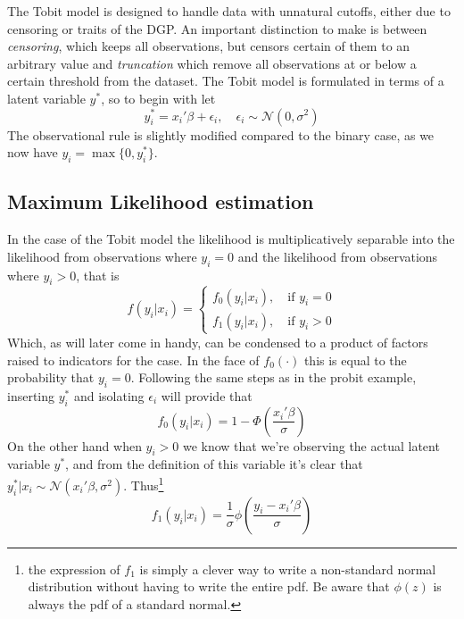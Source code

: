The Tobit model is designed to handle data with unnatural cutoffs, either due to censoring or traits of the DGP. An important distinction to make is between \textit{censoring}, which keeps all observations, but censors certain of them to an arbitrary value and \textit{truncation} which remove all observations at or below a certain threshold from the dataset. The Tobit model is formulated in terms of a latent variable $y^*$, so to begin with let
\begin{equation}
y_i^* = x_i'\beta + \epsilon_i, \quad \epsilon_i \sim \mathcal{N}(0, \sigma^2)
\end{equation}
The observational rule is slightly modified compared to the binary case, as we now have $y_i = \max\{0, y_i^*\}$.

\subsection{Maximum Likelihood estimation}
In the case of the Tobit model the likelihood is multiplicatively separable into the likelihood from observations where $y_i=0$ and the likelihood from observations where $y_i >0$, that is
\begin{equation}
  f(y_i|x_i) =
   \begin{cases}
     f_0(y_i|x_i), \quad \textrm{if }y_i = 0 \\
     f_1(y_i|x_i), \quad \textrm{if }y_i > 0
   \end{cases}
\end{equation}
Which, as will later come in handy, can be condensed to a product of factors raised to indicators for the case. In the face of $f_0(\cdot)$ this is equal to the probability that $y_i=0$. Following the same steps as in the probit example, inserting $y^*_i$ and isolating $\epsilon_i$ will provide that
\begin{equation}
  f_0(y_i|x_i) = 1 - \Phi \left(\frac{x_i'\beta}{\sigma}\right)
\end{equation}
On the other hand when $y_i>0$ we know that we're observing the actual latent variable $y^*$, and from the definition of this variable it's clear that $y^*_i|x_i \sim \mathcal{N}(x_i'\beta, \sigma^2)$. Thus\footnote{the expression of $f_1$ is simply a clever way to write a non-standard normal distribution without having to write the entire pdf. Be aware that $\phi(z)$ is always the pdf of a standard normal.}
\begin{equation}
  f_1(y_i|x_i) = \frac{1}{\sigma} \phi\left( \frac{y_i - x_i'\beta}{\sigma}
  \right)
\end{equation}
